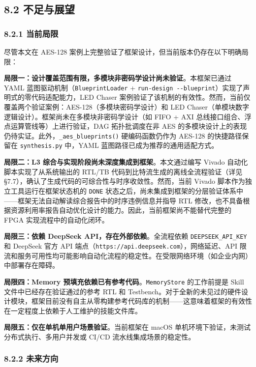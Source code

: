 \subsection{8.2 不足与展望}\label{ux4e0dux8db3ux4e0eux5c55ux671b}

\subsubsection{8.2.1 当前局限}\label{ux5f53ux524dux5c40ux9650}

尽管本文在 AES-128
案例上完整验证了框架设计，但当前版本仍存在以下明确局限：

\textbf{局限一：设计覆盖范围有限，多模块非密码学设计尚未验证}。本框架已通过
YAML 蓝图驱动机制（\texttt{BlueprintLoader} +
\texttt{run-design\ -\/-blueprint}）实现了声明式的零代码适配能力，LED
Chaser
案例验证了该机制的有效性。然而，当前仅覆盖两个验证案例：AES-128（多模块密码学设计）和
LED Chaser（单模块数字逻辑设计）。框架尚未在多模块非密码学设计（如 FIFO
+ AXI 总线接口组合、浮点运算管线等）上进行验证，DAG 拓扑批调度在非 AES
的多模块设计上的表现仍待实证。此外，\texttt{\_aes\_blueprints()}
硬编码函数仍作为 AES-128 的快捷路径保留在 \texttt{synthesis.py} 中，YAML
蓝图路径已成为推荐的通用适配方式。

\textbf{局限二：L3 综合与实现阶段尚未深度集成到框架}。本文通过编写 Vivado
自动化脚本实现了从系统输出的 RTL/TB 代码到比特流生成的离线全流程验证（详见
§7.7），确认了生成代码的可综合性与时序收敛性。然而，当前 Vivado
脚本作为独立工具运行在框架状态机的 \texttt{DONE}
状态之后，尚未集成到框架的分层验证体系中------框架无法自动解读综合报告中的时序违例信息并指导
RTL 修改，也不具备根据资源利用率报告自动优化设计的能力。因此，当前框架尚不能替代完整的
FPGA 实现流程中的自动化闭环。

\textbf{局限三：依赖 DeepSeek API，存在外部依赖}。全流程依赖
\texttt{DEEPSEEK\_API\_KEY} 和 DeepSeek 官方 API
端点（\texttt{https://api.deepseek.com}），网络延迟、API
限流和服务可用性均可能影响自动化流程的稳定性。在受限网络环境（如企业内网）中部署存在障碍。

\textbf{局限四：Memory 预填充依赖已有参考代码}。\texttt{MemoryStore}
的工作前提是 Skill 文件中已经存在验证通过的参考 RTL 和
Testbench。对于全新的未见过的硬件设计模块，框架目前没有自主从零构建参考代码库的机制------这意味着框架的有效性在一定程度上依赖于人工维护的技能文件库。

\textbf{局限五：仅在单机单用户场景验证}。当前框架在 macOS
单机环境下验证，未测试分布式执行、多用户并发或 CI/CD
流水线集成场景的稳定性。

\subsubsection{8.2.2 未来方向}\label{ux672aux6765ux65b9ux5411}

